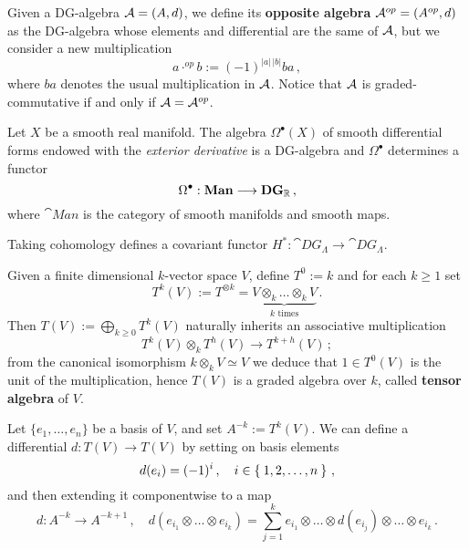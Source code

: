 	\begin{df}
		Given a DG-algebra $\mathcal{A} = (A,d)$, we define its \textbf{opposite algebra}
		$\mathcal{A}^{op} = (A^{op},d)$ as the DG-algebra whose elements and differential
		are the same of $\mathcal{A}$, but we consider a new multiplication
		\begin{equation*}
			a \cdot^{op} b := (-1)^{|a|\,|b|} ba\,,
		\end{equation*}
		where $ba$ denotes the usual multiplication in $\mathcal{A}$.
		Notice that $\mathcal{A}$ is graded-commutative if and only if $\mathcal{A} = \mathcal{A}^{op}$.
	\end{df}
	
	\begin{ex}
		Let $X$ be a smooth real manifold.
		The algebra $\Omega^{\bullet}(X)$
		of smooth differential forms endowed with 
		the \emph{exterior derivative} is a DG-algebra
		and $\Omega^{\bullet}$ determines a functor
		\begin{equation*}
			\Omega^{\bullet} : {\normalfont\textbf{Man}} \longrightarrow {\normalfont\textbf{DG}}_{{\mathbb R}}\,,
		\end{equation*}
		where $\cat{Man}$ is the category of smooth manifolds and smooth maps.
	\end{ex}
	
	\begin{ex}
		Taking cohomology defines a covariant functor 
		$H^{*}:\cat{DG}_{\Lambda} \to \cat{DG}_{\Lambda}$.
	\end{ex}
	
	\begin{ex}
		Given a finite dimensional $k$-vector space $V$, 
		define $T^{0} := k$ and for each $k \ge 1$ set
		\begin{equation*}
			T^{k}(V) := T^{\otimes k} 
			= \underbrace{V \otimes_{k} \dots \otimes_{k} V}_{k \text{ times}}\,.
		\end{equation*}
		Then $T(V) := \bigoplus_{k \ge 0} T^{k}(V)$ naturally 
		inherits an associative multiplication
		\begin{equation*}
			T^{k}(V) \otimes_{k} T^{h}(V) \longrightarrow T^{k+h}(V)\,;
		\end{equation*}
		from the canonical isomorphism $k \otimes_{k} V \simeq V$ 
		we deduce that $1 \in T^{0}(V)$ is the unit of the multiplication,
		hence $T(V)$ is a graded algebra over $k$,
		called \textbf{tensor algebra} of $V$.
		
		Let $\{e_{1}, \dots, e_{n}\}$ be a basis of $V$,
		and set $A^{-k}:=T^{k}(V)$.
		We can define a differential $d:T(V) \to T(V)$
		by setting on basis elements 
		\begin{equation*}
			d(e_{i}) = (-1)^{i}\,, \quad i \in \Set{1, 2, \dots, n}\,,
		\end{equation*}
		and then extending it componentwise to a map
		\begin{equation*}
			d : A^{-k} \longrightarrow A^{-k+1}\,, \quad
			d(e_{i_{1}} \otimes \dots \otimes e_{i_{k}})
			= \sum_{j=1}^{k} e_{i_1} \otimes \dots 
			\otimes d(e_{i_{j}}) \otimes \dots \otimes e_{i_{k}}\,.
		\end{equation*}
	\end{ex}
	
